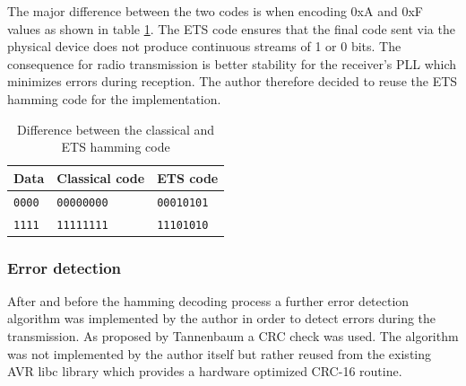 The major difference between the two codes is when encoding 0xA and 0xF values as shown in table \ref{tab:hamming_diff}. The ETS code ensures that the final code sent via the physical device does not produce continuous streams of 1 or 0 bits. The consequence for radio transmission is better stability for the receiver's PLL which minimizes errors during reception. The author therefore decided to reuse the ETS hamming code for the implementation.

\begin{table}[H]
\centering
\begin{tabular}{l | l | l}
Data & Classical code & ETS code \\
\hline
\texttt{0000} & \texttt{00000000} & \texttt{00010101} \\
\texttt{1111} & \texttt{11111111} & \texttt{11101010} \\
\end{tabular}
\caption{Difference between the classical and ETS hamming code}
\label{tab:hamming_diff}
\end{table}

\subsubsection{Error detection}%
After and before the hamming decoding process a further error detection algorithm was implemented by the author in order to detect errors during the transmission. As proposed by Tannenbaum a CRC check was used. The algorithm was not implemented by the author itself but rather reused from the existing AVR libc library which provides a hardware optimized CRC-16 routine.

